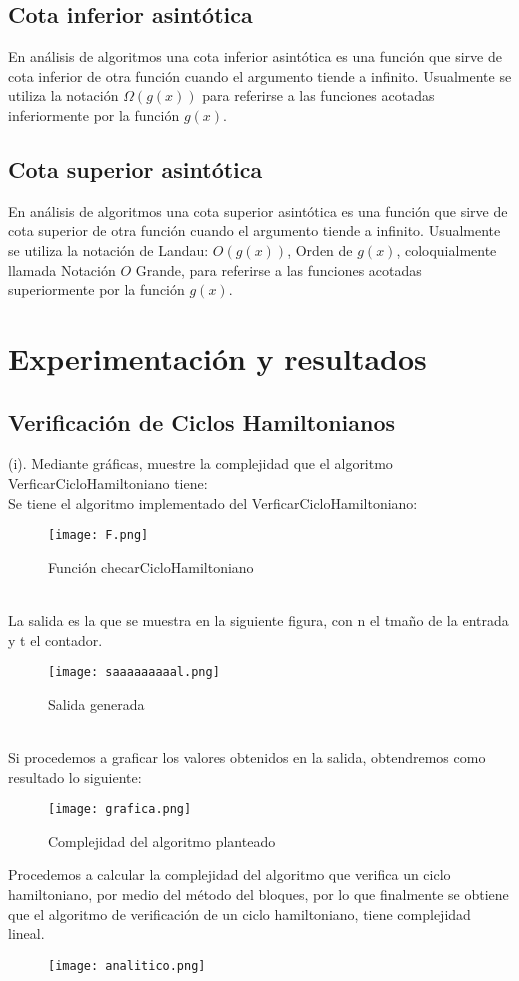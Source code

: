 \documentclass[12pt,twoside]{article}
\begin{document}
\subsection{Cota inferior asintótica}
En análisis de algoritmos una cota inferior asintótica es una función que sirve de cota inferior de otra función cuando el argumento tiende a infinito. Usualmente se utiliza la notación $\Omega(g(x))$ para referirse a las funciones acotadas inferiormente por la función $g(x)$.\cite{cota}

\subsection{Cota superior asintótica}
En análisis de algoritmos una cota superior asintótica es una función que sirve de cota superior de otra función cuando el argumento tiende a infinito. Usualmente se utiliza la notación de Landau: $O(g(x))$, Orden de $g(x)$, coloquialmente llamada Notación $O$ Grande, para referirse a las funciones acotadas superiormente por la función $g(x)$.\cite{cota}

\section{Experimentación y resultados}
\subsection{Verificación de Ciclos Hamiltonianos}
(i). Mediante gráficas, muestre la complejidad que el algoritmo VerficarCicloHamiltoniano tiene:\\
Se tiene el algoritmo implementado del VerficarCicloHamiltoniano: \\
\begin{figure}[h]
\centering
\texttt{[image: F.png]}
\caption{Función checarCicloHamiltoniano}
\end{figure}
\\
La salida es la que se muestra en la siguiente figura, con n el tmaño de la entrada y t el contador.\\
\begin{figure}[H]
\centering
\texttt{[image: saaaaaaaaal.png]}
\caption{Salida generada}
\end{figure}
\\
Si procedemos a graficar los valores obtenidos en la salida, obtendremos como resultado lo siguiente:
\\
\begin{figure}[H]
\centering
\texttt{[image: grafica.png]}
\caption{Complejidad del algoritmo planteado}
\end{figure}
Procedemos a calcular la complejidad del algoritmo que verifica un ciclo hamiltoniano, por medio del método del bloques, por lo que finalmente se obtiene que el algoritmo de verificación de un ciclo hamiltoniano, tiene complejidad lineal.
\begin{figure}[H]
\centering
\texttt{[image: analitico.png]}
\end{figure}
\end{document}
